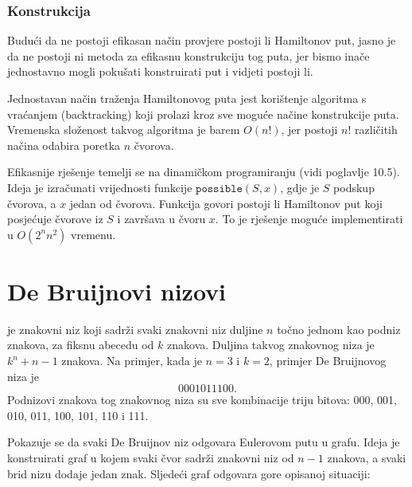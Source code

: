 \subsubsection{Konstrukcija}

Budući da ne postoji efikasan način provjere postoji li
Hamiltonov put, jasno je da ne postoji ni metoda
za efikasnu konstrukciju tog puta, jer bismo inače
jednostavno mogli pokušati konstruirati put i vidjeti
postoji li.

Jednostavan način traženja Hamiltonovog puta jest
korištenje algoritma s vraćanjem (backtracking) koji prolazi kroz sve
moguće načine konstrukcije puta.
Vremenska složenost takvog algoritma je barem $O(n!)$,
jer postoji $n!$ različitih načina odabira poretka $n$ čvorova.

Efikasnije rješenje temelji se na dinamičkom programiranju
(vidi poglavlje 10.5).
Ideja je izračunati vrijednosti
funkcije $\texttt{possible}(S,x)$,
gdje je $S$ podskup čvorova, a $x$
jedan od čvorova.
Funkcija govori postoji li Hamiltonov put
koji posjećuje čvorove iz $S$ i završava u čvoru $x$.
To je rješenje moguće implementirati u $O(2^n n^2)$ vremenu.

\section{De Bruijnovi nizovi}


je znakovni niz koji sadrži
svaki znakovni niz duljine $n$
točno jednom kao podniz znakova, za fiksnu
abecedu od $k$ znakova.
Duljina takvog znakovnog niza je 
$k^n+n-1$ znakova.
Na primjer, kada je $n=3$ i $k=2$,
primjer De Bruijnovog niza je
\[0001011100.\]
Podnizovi znakova tog znakovnog niza su sve
kombinacije triju bitova:
000, 001, 010, 011, 100, 101, 110 i 111.

Pokazuje se da svaki De Bruijnov niz
odgovara Eulerovom putu u grafu.
Ideja je konstruirati graf u kojem
svaki čvor sadrži znakovni niz od $n-1$ znakova,
a svaki brid nizu dodaje jedan znak.
Sljedeći graf odgovara gore opisanoj situaciji:

